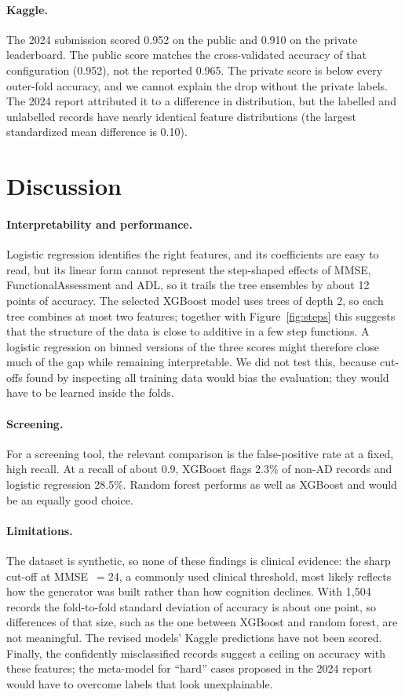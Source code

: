 \documentclass[11pt]{article}
\begin{document}
\paragraph{Kaggle.} The 2024 submission scored 0.952 on the public and 0.910 on the private
leaderboard. The public score matches the cross-validated accuracy of that configuration (0.952),
not the reported 0.965. The private score is below every outer-fold accuracy, and we cannot explain the
drop without the private labels. The 2024 report attributed it to a difference in distribution, but the
labelled and unlabelled records have nearly identical feature distributions (the largest standardized
mean difference is 0.10).

\section{Discussion}
\paragraph{Interpretability and performance.} Logistic regression identifies the right
features, and its coefficients are easy to read, but its linear form cannot represent the step-shaped
effects of MMSE, FunctionalAssessment and ADL, so it trails the tree ensembles by about 12 points of
accuracy. The selected XGBoost model uses trees of depth 2, so each tree combines at most two features;
together with Figure~\ref{fig:steps} this suggests that the structure of the data is close to additive in
a few step functions. A logistic regression on binned versions of the three scores might therefore close
much of the gap while remaining interpretable. We did not test this, because cut-offs found by inspecting
all training data would bias the evaluation; they would have to be learned inside the folds.

\paragraph{Screening.} For a screening tool, the relevant comparison is the false-positive rate at a
fixed, high recall. At a recall of about 0.9, XGBoost flags 2.3\% of non-AD records and logistic
regression 28.5\%. Random forest performs as well as XGBoost and would be an equally good choice.

\paragraph{Limitations.} The dataset is synthetic, so none of these findings is clinical evidence: the
sharp cut-off at MMSE~$=24$, a commonly used clinical threshold, most likely reflects how the generator
was built rather than how cognition declines. With 1,504 records the fold-to-fold standard deviation of
accuracy is about one point, so differences of that size, such as the one between XGBoost and random
forest, are not meaningful. The revised models' Kaggle predictions have not been scored. Finally, the
confidently misclassified records suggest a ceiling on accuracy with these features; the meta-model for
``hard'' cases proposed in the 2024 report would have to overcome labels that look unexplainable.
\end{document}
